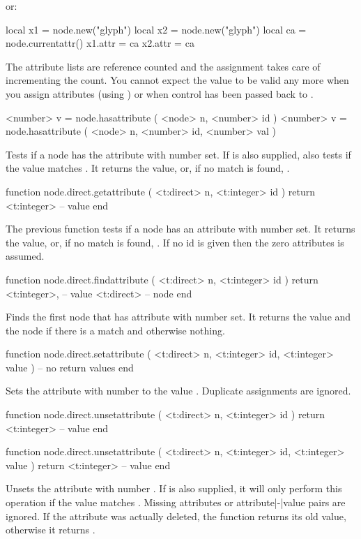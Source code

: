 or:

\starttyping[option=LUA]
local x1 = node.new("glyph")
local x2 = node.new("glyph")
local ca = node.currentattr()
x1.attr = ca
x2.attr = ca
\stoptyping

The attribute lists are reference counted and the assignment takes care of
incrementing the count. You cannot expect the value  to be valid any
more when you assign attributes (using ) or when control
has been passed back to \TEX.

\starttyping[option=LUA]
<number> v = node.hasattribute ( <node> n, <number> id )
<number> v = node.hasattribute ( <node> n, <number> id, <number> val )
\stoptyping

Tests if a node has the attribute with number  set. If  is
also supplied, also tests if the value matches . It returns the value,
or, if no match is found, .

\starttyping[option=LUA]
function node.direct.getattribute ( <t:direct> n, <t:integer> id )
    return <t:integer> -- value
end
\stoptyping

The previous function tests if a node has an attribute with number 
set. It returns the value, or, if no match is found, . If no \type
{id} is given then the zero attributes is assumed.

%
\starttyping[option=LUA]
function node.direct.findattribute ( <t:direct> n, <t:integer> id )
    return
        <t:integer>, -- value
        <t:direct>   -- node
end
\stoptyping

Finds the first node that has attribute with number  set. It returns
the value and the node if there is a match and otherwise nothing.

\starttyping[option=LUA]
function node.direct.setattribute ( <t:direct> n, <t:integer> id, <t:integer> value )
    -- no return values
end
\stoptyping

Sets the attribute with number  to the value . Duplicate
assignments are ignored.

\starttyping[option=LUA]
function node.direct.unsetattribute ( <t:direct> n, <t:integer> id )
    return <t:integer> -- value
end

function node.direct.unsetattribute ( <t:direct> n, <t:integer> id, <t:integer> value )
    return <t:integer> -- value
end
\stoptyping

Unsets the attribute with number . If  is also supplied,
it will only perform this operation if the value matches . Missing
attributes or attribute|-|value pairs are ignored. If the attribute was actually
deleted, the function returns its old value, otherwise it returns .

